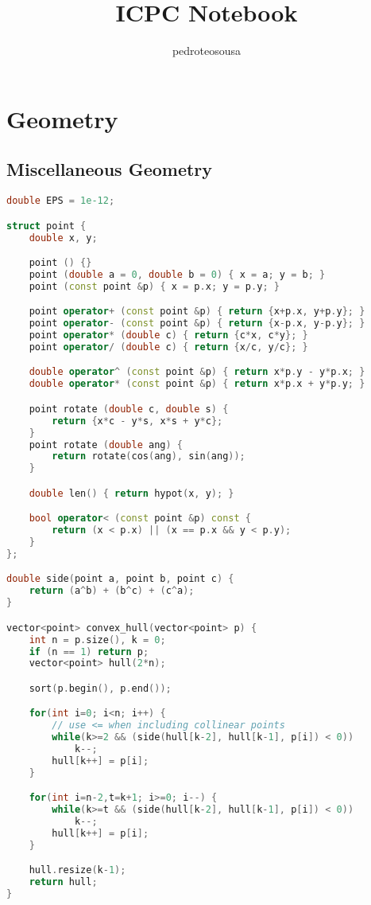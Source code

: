 \documentclass{article}
\title{ICPC Notebook}
\author{pedroteosousa }
\date{}
\begin{document}

\maketitle
\tableofcontents

\section{Geometry}
\subsection{Miscellaneous Geometry}
\begin{lstlisting}[language=C++]
double EPS = 1e-12;

struct point {
	double x, y;

	point () {}
	point (double a = 0, double b = 0) { x = a; y = b; }
	point (const point &p) { x = p.x; y = p.y; }

	point operator+ (const point &p) { return {x+p.x, y+p.y}; }
	point operator- (const point &p) { return {x-p.x, y-p.y}; }
	point operator* (double c) { return {c*x, c*y}; }
	point operator/ (double c) { return {x/c, y/c}; }

	double operator^ (const point &p) { return x*p.y - y*p.x; }
	double operator* (const point &p) { return x*p.x + y*p.y; }

	point rotate (double c, double s) {
		return {x*c - y*s, x*s + y*c}; 
	}
	point rotate (double ang) {
		return rotate(cos(ang), sin(ang));
	}

	double len() { return hypot(x, y); }

	bool operator< (const point &p) const {
		return (x < p.x) || (x == p.x && y < p.y);
	}
};

double side(point a, point b, point c) {
	return (a^b) + (b^c) + (c^a);
}

vector<point> convex_hull(vector<point> p) {
	int n = p.size(), k = 0;
	if (n == 1) return p;
	vector<point> hull(2*n);

	sort(p.begin(), p.end());

	for(int i=0; i<n; i++) {
		// use <= when including collinear points
		while(k>=2 && (side(hull[k-2], hull[k-1], p[i]) < 0))
			k--;
		hull[k++] = p[i];
	}

	for(int i=n-2,t=k+1; i>=0; i--) {
		while(k>=t && (side(hull[k-2], hull[k-1], p[i]) < 0))
			k--;
		hull[k++] = p[i];
	}

	hull.resize(k-1);
	return hull;
}
\end{lstlisting}
\end{document}
